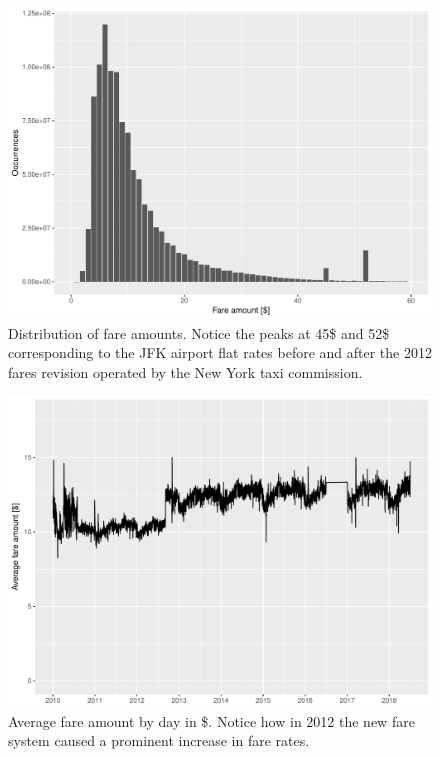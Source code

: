 \documentclass{acm_proc_article-sp-sigmod09}
\begin{document}
\begin{figure}
	\centering
	\includegraphics[width=1\columnwidth]{resources/base_plots/fare_amount_distr.pdf}
	\caption{Distribution of fare amounts. Notice the peaks at 45\$ and 52\$ corresponding to the JFK airport flat rates before and after the 2012 fares revision operated by the New York taxi commission.}
	\label{fig:fareAmountDistr}
\end{figure}

\begin{figure}
	\centering
	\includegraphics[width=1\columnwidth]{resources/base_plots/overall_fare_amount.pdf}
	\caption{Average fare amount by day in \$. Notice how in 2012 the new fare system caused a prominent increase in fare rates.}
	\label{fig:overallFareAmount}
\end{figure}
\end{document}
